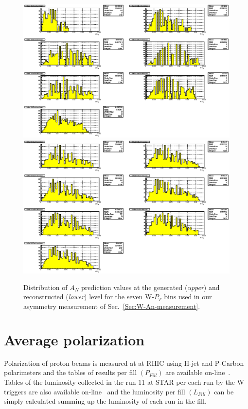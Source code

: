\documentclass[12pt]{article}
\begin{document}
\begin{figure}[htbp]
\begin{center}
\includegraphics[scale=0.87]{images/systematics/plot_Wm_An_evol_ZK_Vs_PtGen_projs}
\includegraphics[scale=0.85]{images/systematics/plot_Wm_An_evol_ZK_Vs_PtRec_projs}
\end{center}
\caption{Distribution of $A_{N}$ prediction values at the generated ({\it upper}) and reconstructed ({\it lower}) level for the seven W-$P_{T}$ bins used in our asymmetry measurement of Sec.~\ref{Sec:W-An-measurement}.}
\label{fig:SysAnPt} 
\end{figure}

\section{Average polarization} \label{Sec:Average-Polarization}
Polarization of proton beams is measured at at RHIC using H-jet and P-Carbon polarimeters and the tables of results per fill $(P_{Fill})$ are available on-line~\cite{RHIC-Pol-by-Fill}. Tables of the luminosity collected in the run 11 at STAR per each run by the W triggers are also available on-line~\cite{STAR-Lumi-by-Run} and the luminosity per fill $(L_{Fill})$ can be simply calculated summing up the luminosity of each run in the fill. 
\end{document}

